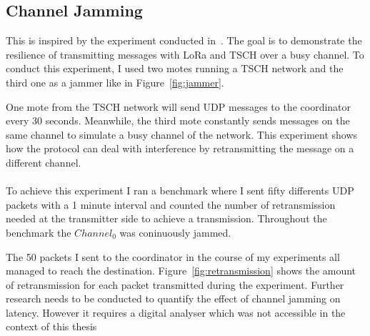 \subsection{Channel Jamming\label{section:jamming}}

This is inspired by the experiment conducted in~\cite{tschoverlora}.
The goal is to demonstrate the resilience of transmitting messages with LoRa and
TSCH over a busy channel.
To conduct this experiment, I used two motes running a TSCH network and the third one
as a jammer like in Figure~\ref{fig:jammer}.



One mote from the TSCH network will send UDP messages to the coordinator
every 30 seconds.
Meanwhile, the third mote constantly sends messages on the same channel to
simulate a busy channel of the network.
This experiment shows how the protocol can deal with interference by retransmitting
the message on a different channel.

\paragraph{}

To achieve this experiment I ran a benchmark where I sent fifty differents UDP packets
with a 1 minute interval and counted the number of retransmission needed at
the transmitter side to achieve a transmission.
Throughout the benchmark the $Channel_0$ was coninuously jammed.

The 50 packets I sent to the coordinator in the course of my experiments
all managed to reach the destination.
Figure~\ref{fig:retransmission} shows the amount of retransmission for each
packet transmitted during the experiment.
Further research needs to be conducted to quantify the effect of channel
jamming on latency. However it requires a digital analyser which was not
accessible in the context of this thesis

